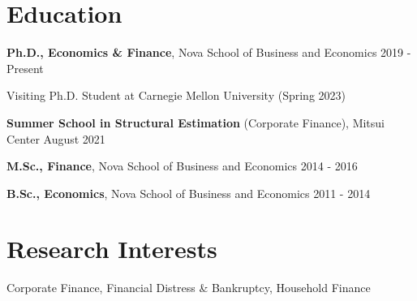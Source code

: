 \documentclass[letterpaper]{article}
\newenvironment{itemize*}{
  \begin{list}{}{
    \setlength{\leftmargin}{1.5em}
  }
}{
  \end{list}
}
\begin{document}
\section*{Education}
\vspace{-0.2in}
\hrulefill
\begin{itemize*}
\item \textbf{Ph.D., Economics \& Finance}, Nova School of Business and Economics \hfill 2019 - Present
\item \phantom{aaa} Visiting Ph.D. Student at Carnegie Mellon University (Spring 2023)
\item \textbf{Summer School in Structural Estimation} (Corporate Finance), Mitsui Center \hfill August 2021
\item \textbf{M.Sc., Finance}, Nova School of Business and Economics \hfill 2014 - 2016
\item \textbf{B.Sc., Economics}, Nova School of Business and Economics \hfill  2011 - 2014
\end{itemize*}

\section*{Research Interests}
\vspace{-0.2in}
\hrulefill
\begin{itemize*}
\item Corporate Finance, Financial Distress \& Bankruptcy, Household Finance
\end{itemize*}
\end{document}
